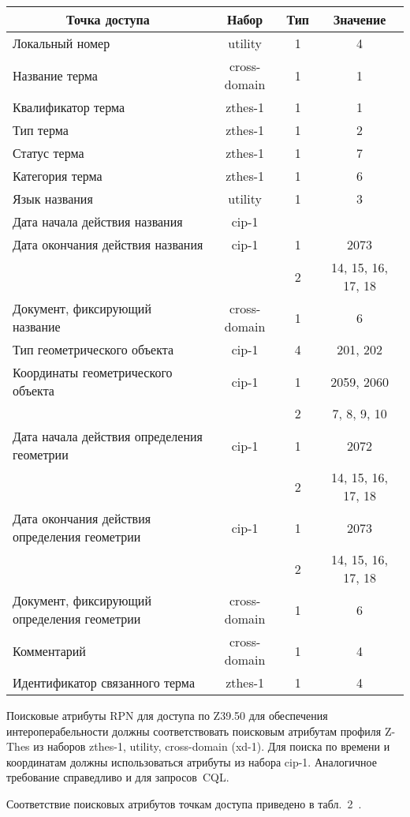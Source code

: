 \begin{multicols}{2}
\begin{table*}
\begin{center}
   \begin{tabular}{|l|c|c|c|}
   \hline
\multicolumn{1}{|c|}{Точка доступа}&Набор&Тип&Значение\\
\hline
Локальный номер&{utility}&1&4\\
Название терма&{cross-domain}&1&1\\
Квалификатор терма&{zthes-1}&1&1\\
Тип терма&{zthes-1}&1&2\\
Статус терма&{zthes-1}&1&7\\
Категория терма&{zthes-1}&1&6\\
Язык названия&{utility}&1&3\\
Дата начала действия названия&{cip-1}&&\\
Дата окончания действия названия&{cip-1}&1&2073\\
&&2&14, 15, 16, 17, 18\\
Документ, фиксирующий название&{cross-domain}&1&6\\
Тип геометрического объекта&{cip-1}&4&201, 202\\
Координаты геометрического объекта&{cip-1}&1&2059, 2060\\
&&2&7, 8, 9, 10\\
Дата начала действия определения геометрии&{cip-1}&1&2072\\
&&2&14, 15, 16, 17, 18\\
Дата окончания действия определения геометрии&{cip-1}&1&2073\\
&&2&14, 15, 16, 17, 18\\
Документ, фиксирующий определения геометрии&{cross-domain}&1&6\\
Комментарий&{cross-domain}&1&4\\
Идентификатор связанного терма&{zthes-1}&1&4\\
\hline
  \end{tabular}
  \end{center}
  \end{table*}
  
  Поисковые атрибуты {RPN} для доступа по Z39.50 для обеспечения 
интероперабельности должны соответствовать поисковым атрибутам профиля \mbox{Z-Thes} 
из наборов {zthes-1}, {utility}, {cross-domain} (\mbox{xd-1}). Для поиска по 
времени и координатам должны использоваться атрибуты из набора {cip-1}. 
Аналогичное требование справедливо и для запросов~{CQL}.
  
  Соответствие поисковых атрибутов точкам доступа приведено в табл.~2~\cite{15-sk}.
  

\end{multicols}
